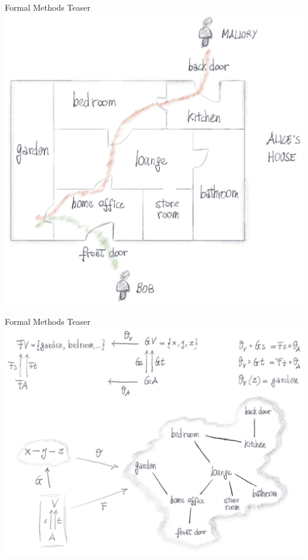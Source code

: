 \begin{frame}{Formal Methods Teaser}
  \includegraphics[height=0.8\paperheight]{./media/ambiguous-spec_trivial-example.png}
\end{frame}


\begin{frame}{Formal Methods Teaser}
  \includegraphics[height=0.8\paperheight]{./media/formal-spec_trivial-example.png}
\end{frame}
